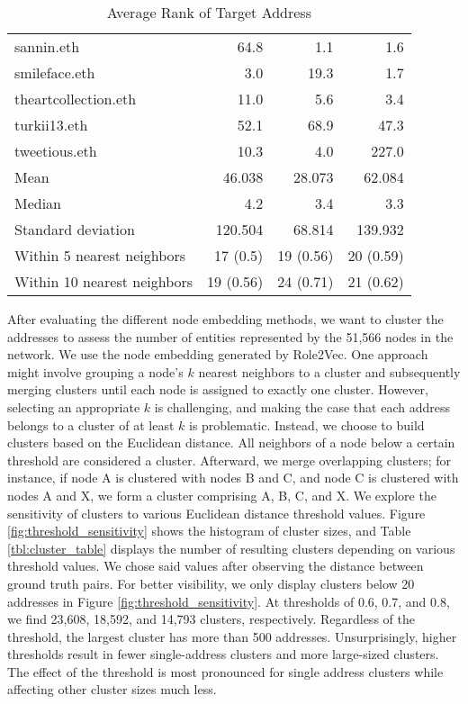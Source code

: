 \documentclass[12pt,a4paper,titlepage,oneside,english]{article}
\begin{document}
\begin{table}[h!]
\begin{tabular}{lrrr}
	sannin.eth & 64.8 & 1.1 & 1.6 \\
	smileface.eth & 3.0 & 19.3 & 1.7 \\
	theartcollection.eth & 11.0 & 5.6 & 3.4 \\
	turkii13.eth & 52.1 & 68.9 & 47.3 \\
	tweetious.eth & 10.3 & 4.0 & 227.0 \\
    \hline
    Mean & 46.038 & 28.073 & 62.084 \\
    Median & 4.2 & 3.4 & 3.3 \\
    Standard deviation & 120.504 & 68.814 &  139.932\\
    Within 5 nearest neighbors & 17 (0.5) & 19 (0.56) & 20 (0.59) \\
    Within 10 nearest neighbors & 19 (0.56) & 24 (0.71) & 21 (0.62)\\
    \hline
  \end{tabular}
  \caption{Average Rank of Target Address}
  \label{tbl:ENS_Domain_Ranks}
\end{table}

After evaluating the different node embedding methods, we want to cluster the addresses to assess the number of entities represented by the 51,566 nodes in the network. We use the node embedding generated by Role2Vec. \newline
One approach might involve grouping a node's $k$ nearest neighbors to a cluster and subsequently merging clusters until each node is assigned to exactly one cluster. However, selecting an appropriate $k$ is challenging, and making the case that each address belongs to a cluster of at least $k$ is problematic. \newline
Instead, we choose to build clusters based on the Euclidean distance. All neighbors of a node below a certain threshold are considered a cluster. Afterward, we merge overlapping clusters; for instance, if node A is clustered with nodes B and C, and node C is clustered with nodes A and X, we form a cluster comprising A, B, C, and X. \newline
We explore the sensitivity of clusters to various Euclidean distance threshold values. Figure \ref{fig:threshold_sensitivity} shows the histogram of cluster sizes, and Table \ref{tbl:cluster_table} displays the number of resulting clusters depending on various threshold values. We chose said values after observing the distance between ground truth pairs. For better visibility, we only display clusters below 20 addresses in Figure \ref{fig:threshold_sensitivity}. At thresholds of 0.6, 0.7, and 0.8, we find 23,608, 18,592, and 14,793 clusters, respectively. Regardless of the threshold, the largest cluster has more than 500 addresses. Unsurprisingly, higher thresholds result in fewer single-address clusters and more large-sized clusters. The effect of the threshold is most pronounced for single address clusters while affecting other cluster sizes much less. 
\end{document}
